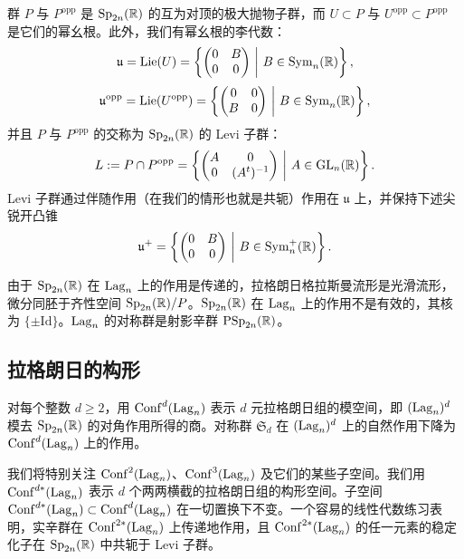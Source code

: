 群 $P$ 与 $P^{\mathrm{opp}}$ 是 $\operatorname{Sp}_{2n}(\mathbb{R})$ 的互为对顶的极大抛物子群，而 $U\subset P$ 与 $U^{\mathrm{opp}}\subset P^{\mathrm{opp}}$ 是它们的幂幺根。此外，我们有幂幺根的李代数：
\[
\mathfrak{u}=\operatorname{Lie}(U)
=\left\{\begin{pmatrix} 0 & B\\ 0 & 0\end{pmatrix}\ \middle|\ B\in\Sym_n(\R)\right\},
\]
\[
\mathfrak{u}^{\mathrm{opp}}=\operatorname{Lie}(U^{\mathrm{opp}})
=\left\{\begin{pmatrix} 0 & 0\\ B & 0\end{pmatrix}\ \middle|\ B\in\Sym_n(\R)\right\},
\]
并且 $P$ 与 $P^{\mathrm{opp}}$ 的交称为 $\operatorname{Sp}_{2n}(\mathbb{R})$ 的 Levi 子群：
\[
L:=P\cap P^{\mathrm{opp}}
=\left\{\begin{pmatrix} A & 0\\ 0 & (A^{t})^{-1}\end{pmatrix}\ \middle|\ A\in\GL_n(\R)\right\}.
\]
Levi 子群通过伴随作用（在我们的情形也就是共轭）作用在 $\mathfrak{u}$ 上，并保持下述尖锐开凸锥
\[
\mathfrak{u}^{+}=\left\{\begin{pmatrix} 0 & B\\ 0 & 0\end{pmatrix}\ \middle|\ B\in\Sym_n^{+}(\R)\right\}.
\]

由于 $\operatorname{Sp}_{2n}(\mathbb{R})$ 在 $\operatorname{Lag}_n$ 上的作用是传递的，拉格朗日格拉斯曼流形是光滑流形，微分同胚于齐性空间 $\operatorname{Sp}_{2n}(\mathbb{R})/P$。$\operatorname{Sp}_{2n}(\mathbb{R})$ 在 $\operatorname{Lag}_n$ 上的作用不是有效的，其核为 $\{\pm\mathrm{Id}\}$。$\operatorname{Lag}_n$ 的对称群是射影辛群 $\mathrm{PSp}_{2n}(\mathbb{R})$。

\subsection{拉格朗日的构形}

对每个整数 $d\ge 2$，用 $\operatorname{Conf}^{d}(\operatorname{Lag}_n)$ 表示 $d$ 元拉格朗日组的模空间，即 $(\operatorname{Lag}_n)^{d}$ 模去 $\operatorname{Sp}_{2n}(\mathbb{R})$ 的对角作用所得的商。对称群 $\mathfrak{S}_d$ 在 $(\operatorname{Lag}_n)^{d}$ 上的自然作用下降为 $\operatorname{Conf}^{d}(\operatorname{Lag}_n)$ 上的作用。

我们将特别关注 $\operatorname{Conf}^{2}(\operatorname{Lag}_n)$、$\operatorname{Conf}^{3}(\operatorname{Lag}_n)$ 及它们的某些子空间。我们用 $\operatorname{Conf}^{d*}(\operatorname{Lag}_n)$ 表示 $d$ 个两两横截的拉格朗日组的构形空间。子空间 $\operatorname{Conf}^{d*}(\operatorname{Lag}_n)\subset\operatorname{Conf}^{d}(\operatorname{Lag}_n)$ 在一切置换下不变。一个容易的线性代数练习表明，实辛群在 $\operatorname{Conf}^{2*}(\operatorname{Lag}_n)$ 上传递地作用，且 $\operatorname{Conf}^{2*}(\operatorname{Lag}_n)$ 的任一元素的稳定化子在 $\operatorname{Sp}_{2n}(\mathbb{R})$ 中共轭于 Levi 子群。


